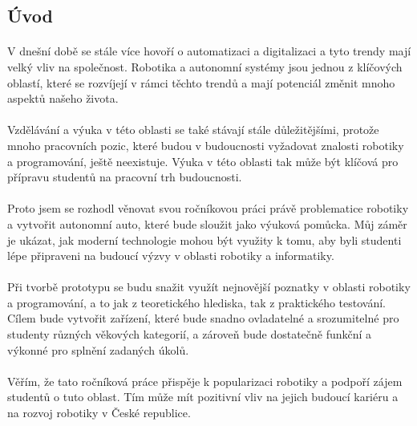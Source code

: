 \documentclass[12pt]{article}
\begin{document}
\begin{spacing}{1.5}
	\newpage
	\tableofcontents
	
	\newpage
	\section{Úvod}
	\paragraph{} V dnešní době se stále více hovoří o automatizaci a digitalizaci a tyto trendy mají velký vliv na společnost. Robotika a autonomní systémy jsou jednou z klíčových oblastí, které se rozvíjejí v rámci těchto trendů a mají potenciál změnit mnoho aspektů našeho života.
	\paragraph{} Vzdělávání a výuka v této oblasti se také stávají stále důležitějšími, protože mnoho pracovních pozic, které budou v budoucnosti vyžadovat znalosti robotiky a programování, ještě neexistuje. Výuka v této oblasti tak může být klíčová pro přípravu studentů na pracovní trh budoucnosti.
	\paragraph{} Proto jsem se rozhodl věnovat svou ročníkovou práci právě problematice robotiky a vytvořit autonomní auto, které bude sloužit jako výuková pomůcka. Můj záměr je ukázat, jak moderní technologie mohou být využity k tomu, aby byli studenti lépe připraveni na budoucí výzvy v oblasti robotiky a informatiky.
	\paragraph{} Při tvorbě prototypu se budu snažit využít nejnovější poznatky v oblasti robotiky a programování, a to jak z teoretického hlediska, tak z praktického testování. Cílem bude vytvořit zařízení, které bude snadno ovladatelné a srozumitelné pro studenty různých věkových kategorií, a zároveň bude dostatečně funkční a výkonné pro splnění zadaných úkolů.
	\paragraph{} Věřím, že tato ročníková práce přispěje k popularizaci robotiky a podpoří zájem studentů o tuto oblast. Tím může mít pozitivní vliv na jejich budoucí kariéru a na rozvoj robotiky v České republice.
	
	\newpage

\end{spacing}
\end{document}
